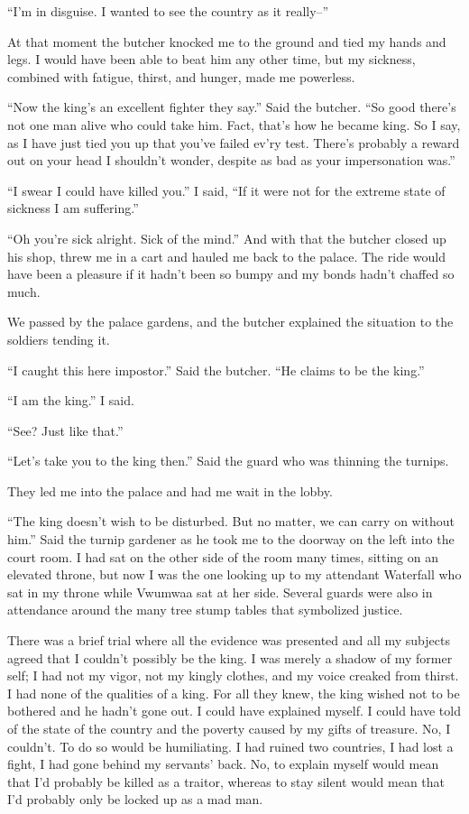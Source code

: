``I'm in disguise. I wanted to see the country as it really--''

At that moment the butcher knocked me to the ground and tied my hands and legs. I would have been able to beat him any other time, but my sickness, combined with fatigue, thirst, and hunger, made me powerless.

``Now the king's an excellent fighter they say.'' Said the butcher. ``So good there's not one man alive who could take him. Fact, that's how he became king. So I say, as I have just tied you up that you've failed ev'ry test. There's probably a reward out on your head I shouldn't wonder, despite as bad as your impersonation was.''

``I swear I could have killed you.'' I said, ``If it were not for the extreme state of sickness I am suffering.''

``Oh you're sick alright. Sick of the mind.'' And with that the butcher closed up his shop, threw me in a cart and hauled me back to the palace. The ride would have been a pleasure if it hadn't been so bumpy and my bonds hadn't chaffed so much.

We passed by the palace gardens, and the butcher explained the situation to the soldiers tending it.

``I caught this here impostor.'' Said the butcher. ``He claims to be the king.''

``I am the king.'' I said.

``See? Just like that.''

``Let's take you to the king then.'' Said the guard who was thinning the turnips.

They led me into the palace and had me wait in the lobby.

``The king doesn't wish to be disturbed. But no matter, we can carry on without him.'' Said the turnip gardener as he took me to the doorway on the left into the court room. I had sat on the other side of the room many times, sitting on an elevated throne, but now I was the one looking up to my attendant Waterfall who sat in my throne while Vwu\-mwaa sat at her side. Several guards were also in attendance around the many tree stump tables that symbolized justice.

\tbreak

There was a brief trial where all the evidence was presented and all my subjects agreed that I couldn't possibly be the king. I was merely a shadow of my former self; I had not my vigor, not my kingly clothes, and my voice creaked from thirst. I had none of the qualities of a king. For all they knew, the king wished not to be bothered and he hadn't gone out. I could have explained myself. I could have told of the state of the country and the poverty caused by my gifts of treasure. No, I couldn't. To do so would be humiliating. I had ruined two countries, I had lost a fight, I had gone behind my servants' back. No, to explain myself would mean that I'd probably be killed as a traitor, whereas to stay silent would mean that I'd probably only be locked up as a mad man.

